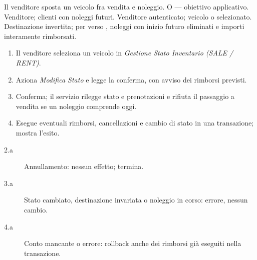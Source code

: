 {Il venditore sposta un veicolo fra vendita e noleggio.}
{O --- obiettivo applicativo.}
{Venditore; clienti con noleggi futuri.}
{Venditore autenticato; veicolo  o  selezionato.}
{Destinazione invertita; per  verso , noleggi con inizio
futuro eliminati e importi interamente rimborsati.}
\principale
\begin{enumerate}
\item Il venditore seleziona un veicolo in \emph{Gestione Stato Inventario (SALE / RENT)}.
\item Aziona \emph{Modifica Stato} e legge la conferma, con avviso dei rimborsi previsti.
\item Conferma; il servizio rilegge stato e prenotazioni e rifiuta il passaggio a vendita se un noleggio comprende oggi.
\item Esegue eventuali rimborsi, cancellazioni e cambio di stato in una transazione; mostra l'esito.
\end{enumerate}
\alternative
\begin{description}
\item[2.a] Annullamento: nessun effetto; termina.
\item[3.a] Stato cambiato, destinazione invariata o noleggio in corso: errore, nessun cambio.
\item[4.a] Conto mancante o errore: rollback anche dei rimborsi gi\`a eseguiti nella transazione.
\end{description}

